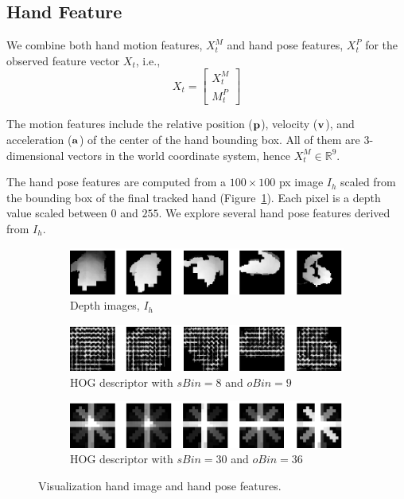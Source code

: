 \documentclass{acm_proc_article-sp}
\begin{document}
\subsection{Hand Feature}
We combine both hand motion features, $X^M_t$ and hand pose features, $X^P_t$
for the observed feature vector $X_t$, i.e., 
\begin{displaymath}
X_t = \left[ \begin{array}{c}
X^M_t\\
M^P_t
\end{array}\right]
\end{displaymath} 

The motion features include the relative position ($\bf{p}$), velocity ($\bf{v}$),
and acceleration ($\bf{a}$) of the center of
the hand bounding box.
All of them are 3-dimensional vectors in the world
coordinate system, hence $X_t^M\in\mathbb{R}^9$. 

The hand pose features are computed from a $100 \times 100$ px image $I_{h}$ scaled
from the bounding box of the final tracked hand (Figure~\ref{fig:depth}). Each pixel
is a depth value scaled between $0$ and $255$. We explore several hand pose 
features derived from $I_h$.

\begin{figure}
\centering
\begin{subfigure}{1\columnwidth}
\includegraphics[width=1\columnwidth]{fig/hand-depth.ps}
\caption{Depth images, $I_h$}
\label{fig:depth}
\end{subfigure}
\begin{subfigure}{1\columnwidth}
\includegraphics[width=1\columnwidth]{fig/hand-hog.ps}
\caption{HOG descriptor with $sBin = 8$ and $oBin = 9$}
\label{fig:hog}
\end{subfigure}
\begin{subfigure}{1\columnwidth}
\includegraphics[width=1\columnwidth]{fig/hand-hog-30-36.ps}
\caption{HOG descriptor with $sBin = 30$ and $oBin = 36$}
\label{fig:hog-30}
\end{subfigure}
\caption{Visualization hand image and hand pose features.}
\label{fig:hand-vis}
\end{figure}
\end{document}

